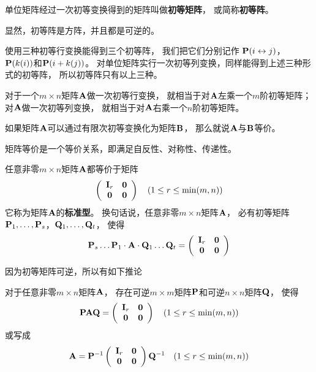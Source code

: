 \begin{definition}[初等阵]
  单位矩阵经过一次初等变换得到的矩阵叫做\textbf{初等矩阵}，
  或简称\textbf{初等阵}。
\end{definition}

\begin{remark}
  显然，初等阵是方阵，并且都是可逆的。
\end{remark}

使用三种初等行变换能得到三个初等阵，
我们把它们分别记作
$\mmRowSwi{i}{j}$，$\mmRowMul{k}{i}$和$\mmRowAdd{i}{+k}{j}$。
对单位矩阵实行一次初等列变换，同样能得到上述三种形式的初等阵，
所以初等阵只有以上三种。

\begin{theorem}[一般矩阵的初等变换与初等阵的联系]
  对于一个$m\times n$矩阵$\mmA$做一次初等行变换，
  就相当于对$\mmA$左乘一个$m$阶初等矩阵；
  对$\mmA$做一次初等列变换，
  就相当于对$\mmA$右乘一个$n$阶初等矩阵。
\end{theorem}

\begin{definition}[矩阵等价]
  如果矩阵$\mmA$可以通过有限次初等变换化为矩阵$\mmB$，
  那么就说$\mmA$与$\mmB$等价。
\end{definition}

\begin{remark}
  矩阵等价是一个等价关系，即满足自反性、对称性、传递性。
\end{remark}

\begin{theorem}[标准型]
  任意非零$m\times n$矩阵$\mmA$都等价于矩阵
  \[
    \mmat{cc}{\mmI_r & \mmZero \\ \mmZero & \mmZero}
    \quad (1\le r \le \min(m,n))
  \]
  它称为矩阵$\mmA$的\textbf{标准型}。
  换句话说，任意非零$m\times n$矩阵$\mmA$，
  必有初等矩阵$\mmP_1,\dots,\mmP_s$，$\mmQ_1,\dots,\mmQ_t$，
  使得
  \[
    \mmP_s\dots\mmP_1\cdot\mmA\cdot\mmQ_1\dots\mmQ_t = 
      \mmat{cc}{\mmI_r & \mmZero \\ \mmZero & \mmZero}
  \]
\end{theorem}

因为初等矩阵可逆，所以有如下推论

\begin{corollary}
  对于任意非零$m\times n$矩阵$\mmA$，
  存在可逆$m\times m$矩阵$\mmP$和可逆$n\times n$矩阵$\mmQ$，
  使得
  \[
    \mmP\mmA\mmQ = \mmat{cc}{\mmI_r & \mmZero \\ \mmZero & \mmZero}
    \quad (1\le r \le \min(m,n))
  \]
  或写成
  \[
    \mmA = \mmP^{-1}\mmat{cc}{\mmI_r & \mmZero \\ \mmZero & \mmZero}\mmQ^{-1}
    \quad (1\le r \le \min(m,n))
  \]
\end{corollary}

